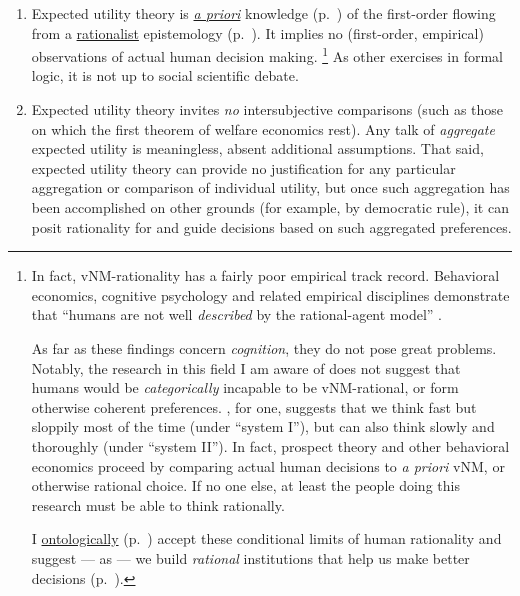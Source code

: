 \begin{enumerate}
	\item
	Expected utility theory is \hyperref[itm:a-priori]{\emph{a priori}} knowledge (p.~\pageref{itm:a-priori}) of the first-order flowing from a \hyperref[itm:rationalism]{rationalist} epistemology (p.~\pageref{itm:rationalism}).
	It implies no (first-order, empirical) observations of actual human decision making.
	\footnote{
		In fact, \gls{vNM}-rationality has a fairly poor empirical track record.
		Behavioral economics, cognitive psychology and related empirical disciplines demonstrate that ``humans are not well \emph{described} by the rational-agent model'' \citep[K7094, emphasis added]{Kahneman2011}.

		As far as these findings concern \emph{cognition}, they do not pose great problems.
		Notably, the research in this field I am aware of does not suggest that humans would be \emph{categorically} incapable to be \gls{vNM}-rational, or form otherwise coherent preferences.
		\citeauthor{Kahneman2011}, for one, suggests that we think fast but sloppily most of the time (under ``system I''), but can also think slowly and thoroughly (under ``system II'').
		In fact, prospect theory and other behavioral economics proceed by comparing actual human decisions to \emph{a priori} \gls{vNM}, or otherwise rational choice.
		If no one else, at least the people doing this research must be able to think rationally.

		I \hyperref[sec:ontology]{ontologically} (p.~\pageref{sec:ontology}) accept these conditional limits of human rationality and suggest --- as \citet[K7094]{Kahneman2011} --- we build \emph{rational} institutions that help us make better decisions (p.~\pageref{sec:contingent-homo-economicus}).
	}
	As other exercises in formal logic, it is not up to social scientific debate.

	\item
	Expected utility theory invites \emph{no} intersubjective comparisons (such as those on which the first theorem of welfare economics rest).
	Any talk of \emph{aggregate} expected utility is meaningless, absent additional assumptions.
	That said, expected utility theory can provide no justification for any particular aggregation or comparison of individual utility, but once such aggregation has been accomplished on other grounds (for example, by democratic rule), it can posit rationality for and guide decisions based on such aggregated preferences.
\end{enumerate}

